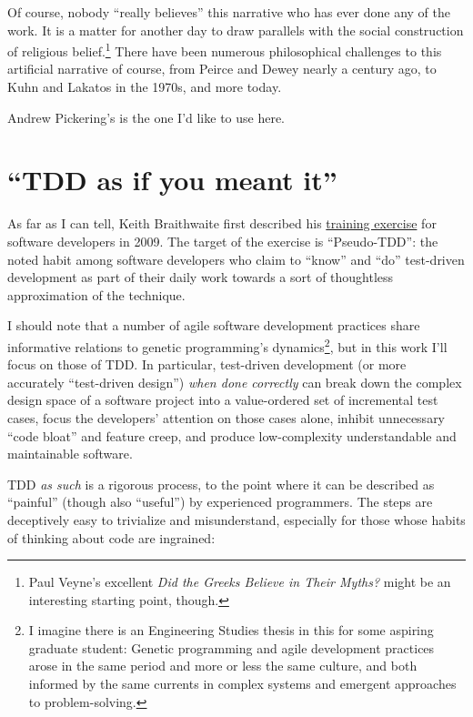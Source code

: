 Of course, nobody ``really believes'' this narrative who has ever done any of the work. It is a matter for another day to draw parallels with the social construction of religious belief.\footnote{Paul Veyne's excellent \emph{Did the Greeks Believe in Their Myths?} might be an interesting starting point, though.} There have been numerous philosophical challenges to this artificial narrative of course, from Peirce and Dewey nearly a century ago, to Kuhn and Lakatos in the 1970s, and more today.

Andrew Pickering's is the one I'd like to use here.

\section{``TDD as if you meant it''}\hypertarget{tdd-as-if-you-meant-it}{}\label{tdd-as-if-you-meant-it}

As far as I can tell, Keith Braithwaite first described his \href{http://cumulative-hypotheses.org/2011/08/30/tdd-as-if-you-meant-it/}{training exercise} for software developers in 2009. The target of the exercise is ``Pseudo-TDD'': the noted habit among software developers who claim to ``know'' and ``do'' test-driven development as part of their daily work towards a sort of thoughtless approximation of the technique.

I should note that a number of agile software development practices share informative relations to genetic programming's dynamics\footnote{I imagine there is an Engineering Studies thesis in this for some aspiring graduate student: Genetic programming and agile development practices arose in the same period and more or less the same culture, and both informed by the same currents in complex systems and emergent approaches to problem-solving.}, but in this work I'll focus on those of TDD. In particular, test-driven development (or more accurately ``test-driven design'') \emph{when done correctly} can break down the complex design space of a software project into a value-ordered set of incremental test cases, focus the developers' attention on those cases alone, inhibit unnecessary ``code bloat'' and feature creep, and produce low-complexity understandable and maintainable software.

TDD \emph{as such} is a rigorous process, to the point where it can be described as ``painful'' (though also ``useful'') by experienced programmers. The steps are deceptively easy to trivialize and misunderstand, especially for those whose habits of thinking about code are ingrained:


